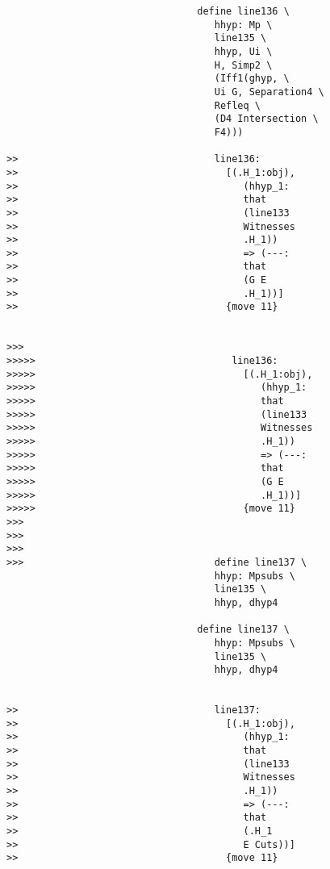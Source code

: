 \documentclass[12pt]{article}
\begin{document}
\begin{verbatim}
                                 define line136 \
                                    hhyp: Mp \
                                    line135 \
                                    hhyp, Ui \
                                    H, Simp2 \
                                    (Iff1(ghyp, \
                                    Ui G, Separation4 \
                                    Refleq \
                                    (D4 Intersection \
                                    F4)))

>>                                  line136:
>>                                    [(.H_1:obj),
>>                                       (hhyp_1:
>>                                       that
>>                                       (line133
>>                                       Witnesses
>>                                       .H_1))
>>                                       => (---:
>>                                       that
>>                                       (G E
>>                                       .H_1))]
>>                                    {move 11}


>>>
>>>>>                                  line136:
>>>>>                                    [(.H_1:obj),
>>>>>                                       (hhyp_1:
>>>>>                                       that
>>>>>                                       (line133
>>>>>                                       Witnesses
>>>>>                                       .H_1))
>>>>>                                       => (---:
>>>>>                                       that
>>>>>                                       (G E
>>>>>                                       .H_1))]
>>>>>                                    {move 11}
>>>
>>>
>>>
>>>                                 define line137 \
                                    hhyp: Mpsubs \
                                    line135 \
                                    hhyp, dhyp4

                                 define line137 \
                                    hhyp: Mpsubs \
                                    line135 \
                                    hhyp, dhyp4


>>                                  line137:
>>                                    [(.H_1:obj),
>>                                       (hhyp_1:
>>                                       that
>>                                       (line133
>>                                       Witnesses
>>                                       .H_1))
>>                                       => (---:
>>                                       that
>>                                       (.H_1
>>                                       E Cuts))]
>>                                    {move 11}



\end{verbatim}
\end{document}
